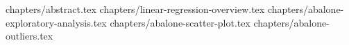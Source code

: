 \documentclass[a4paper,12pt]{article}
\begin{document}
 
 
 

\tableofcontents
\clearpage
{chapters/abstract.tex}
{chapters/linear-regression-overview.tex}
{chapters/abalone-exploratory-analysis.tex}
{chapters/abalone-scatter-plot.tex}
{chapters/abalone-outliers.tex}
 


\end{document}
